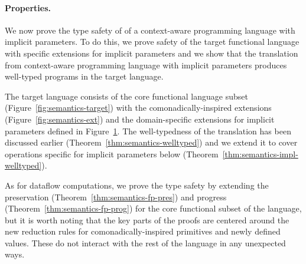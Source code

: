 \begin{figure}[h!]
\label{fig:semantics-ext-impl}
\vspace{1em}
\end{figure}


\paragraph{Properties.}
We now prove the type safety of of a context-aware programming language with implicit parameters.
To do this, we prove safety of the target functional language with specific extensions for implicit
parameters and we show that the translation from context-aware programming language with implicit
parameters produces well-typed programs in the target language.

The target language consists of the core functional language subset (Figure~\ref{fig:semantics-target})
with the comonadically-inspired extensions (Figure~\ref{fig:semantics-ext}) and the domain-specific
extensions for implicit parameters defined in Figure~\ref{fig:semantics-ext-impl}. The well-typedness
of the translation has been discussed earlier (Theorem~\ref{thm:semantics-welltyped}) and we extend
it to cover operations specific for implicit parameters below (Theorem~\ref{thm:semantics-impl-welltyped}).

As for dataflow computations, we prove the type safety by extending the preservation
(Theorem~\ref{thm:semantics-fp-pres}) and progress (Theorem~\ref{thm:semantics-fp-prog})
for the core functional subset of the language, but it is worth noting that the key parts of
the proofs are centered around the new reduction rules for comonadically-inspired primitives
and newly defined  values. These do not interact with the rest of the language in
any unexpected ways.


